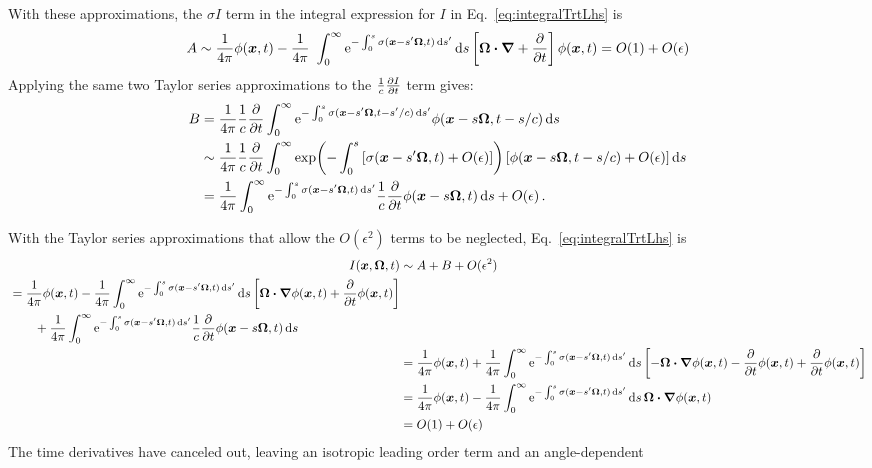 With these approximations, the $\sigma I$ term in the integral expression for
$I$ in Eq.~\eqref{eq:integralTrtLhs} is
\begin{equation*}
  A \sim \frac{1}{4\pi}\phi(\bm{x}, t)
- \frac{1}{4\pi}\ \int_{0}^{\infty} \mathop{}\!\mathrm{e}^{-\int_{0}^{s} \sigma(\bm{x}-s'\bm{\Omega}, t) \mathop{}\!\mathrm{d} s'}
\mathop{}\!\mathrm{d} s
\left[ \bm{\Omega} \bm{\cdot} \bm{\nabla} + \frac{\partial }{\partial t} \right]\phi(\bm{x}, t)
=  O(1) + O(\epsilon)
\end{equation*}
Applying the same two Taylor series approximations to the $\frac1c\frac{\partial I}{\partial t}$
term gives:
\begin{align*}
  B &=
  \frac{1}{4\pi}\frac{1}{c} \pder{}{t} \int_{0}^{\infty}
  \eexp^{ -\int_{0}^{s} \sigma(\vec{x}-s'\vec{\Omega}, t-s'/c) \ud s'}
  \phi(\vec{x} - s \vec{\Omega}, t-s/c)
  \ud s
\\
  &\sim
  \frac{1}{4\pi}\frac{1}{c} \pder{}{t} \int_{0}^{\infty}
  \expp{ -\int_{0}^{s} \left[ \sigma(\vec{x}-s'\vec{\Omega}, t) +
  O(\epsiloncolor{\epsilon}) \right]}
  \left[ \phi(\vec{x} - s \vec{\Omega}, t-s/c) + O(\epsiloncolor{\epsilon}) \right]
  \ud s
\\
&= \frac{1}{4\pi} \int_{0}^{\infty}
  \eexp^{ -\int_{0}^{s} \sigma(\vec{x}-s'\vec{\Omega},t) \ud s'}
 \frac{1}{c} \pder{}{t} \phi(\vec{x} - s \vec{\Omega}, t)
  \ud s
  + O(\epsiloncolor{\epsilon})\,.
\end{align*}

With the Taylor series approximations that allow the $O(\epsilon^2)$ terms to
be neglected, Eq.~\eqref{eq:integralTrtLhs} is
\begin{align*}
  I(\vec{x}, \vec{\Omega}, t) 
  &\sim A + B + O(\epsiloncolor{\epsilon^2}) 
  \\
  \begin{split}
  &= \frac{1}{4\pi}\phi(\vec{x}, t)
- \frac{1}{4\pi}\int_{0}^{\infty} \eexp^{-\int_{0}^{s} \sigma(\vec{x}-s'\vec{\Omega}, t) \ud s'}
\ud s
\left[ \vec{\Omega} \vd \del\phi(\vec{x}, t) + \pder{}{t}\phi(\vec{x}, t)
\right]
\\
&\qquad+ \frac{1}{4\pi} \int_{0}^{\infty}
  \eexp^{ -\int_{0}^{s} \sigma(\vec{x}-s'\vec{\Omega},t) \ud s'}
 \frac{1}{c} \pder{}{t} \phi(\vec{x} - s \vec{\Omega}, t)
  \ud s
  \end{split}
  \\
  &= \frac{1}{4\pi}\phi(\vec{x}, t)
  + \frac{1}{4\pi}\int_{0}^{\infty} \eexp^{-\int_{0}^{s}
  \sigma(\vec{x}-s'\vec{\Omega}, t) \ud s'} \ud s \left[ - \vec{\Omega} \vd
  \del\phi(\vec{x}, t) - \pder{}{t}\phi(\vec{x}, t)
  + \pder{}{t}\phi(\vec{x}, t)
  \right]
  \\
  &= \frac{1}{4\pi}\phi(\vec{x}, t)
  - \frac{1}{4\pi}\int_{0}^{\infty} \eexp^{-\int_{0}^{s}
  \sigma(\vec{x}-s'\vec{\Omega}, t) \ud s'} \ud s \,
  \vec{\Omega} \vd \del\phi(\vec{x}, t)
  \\
  &= O(1) + O(\epsiloncolor{\epsilon})
\end{align*}
The time derivatives have canceled out, leaving an isotropic leading order
term and an angle-dependent 
